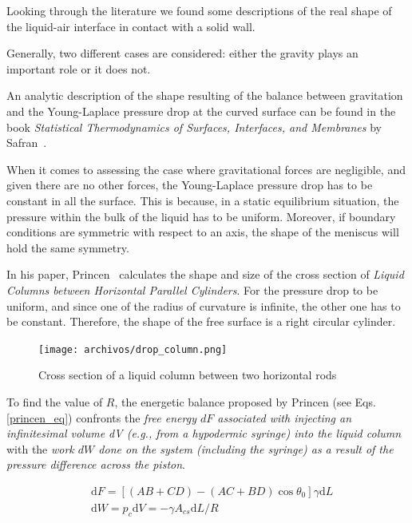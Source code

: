 Looking through the literature we found some descriptions of the real shape of the liquid-air interface in contact with a solid wall. 

Generally, two different cases are considered: either the gravity plays an important role or it does not.

An analytic description of the shape resulting of the balance between gravitation and the Young-Laplace pressure drop at the curved surface can be found in the book \textit{Statistical Thermodynamics of Surfaces, Interfaces, and Membranes} by Safran~\cite{Safran}.

When it comes to assessing the case where gravitational forces are negligible, and given there are no other forces, the Young-Laplace pressure drop has to be constant in all the surface. This is because, in a static equilibrium situation, the pressure within the bulk of the liquid has to be uniform. Moreover, if boundary conditions are symmetric with respect to an axis, the shape of the meniscus will hold the same symmetry. 

In his paper, Princen~\cite{PRINCEN1970} calculates the shape and size of the cross section of \textit{Liquid Columns between Horizontal Parallel Cylinders}. For the pressure drop to be uniform, and since one of the radius of curvature is infinite, the other one has to be constant. Therefore, the shape of the free surface is a right circular cylinder.

\begin{figure}[H]
	\centering
	\texttt{[image: archivos/drop\_column.png]}
	\caption{Cross section of a liquid column between two horizontal rods} 
	\label{drop_column}
\end{figure}

To find the value of $R$, the energetic balance proposed by Princen (see Eqs. \ref{princen_eq}) confronts the \textit{free energy $dF$ associated with injecting an infinitesimal volume dV (e.g., from a hypodermic syringe) into the liquid column} with the \textit{work $dW$ done on the system (including the syringe) as a result of the pressure difference across the piston}.

\begin{equation}
\begin{aligned} &\mathrm{d} F=[(AB+CD)-(AC+BD) \cos \theta_0 ] \gamma \mathrm{d} L \\
& \mathrm{d} W= p_c \mathrm{d} V=-\gamma A_{cs} \mathrm{d} L / R \end{aligned}
\label{princen_eq}
\end{equation}

